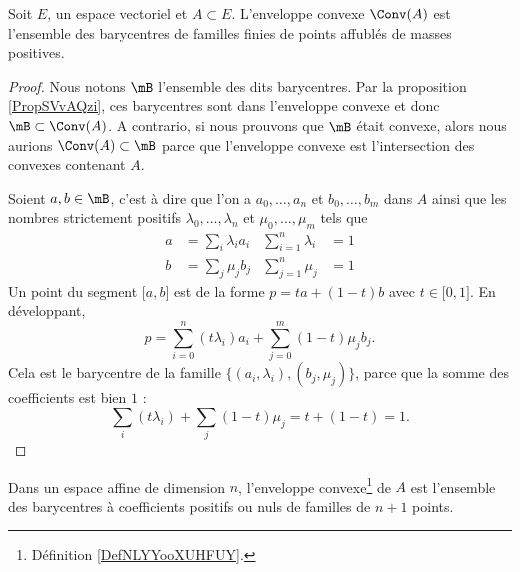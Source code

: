 \begin{proposition} \label{PropYHMTmZX}
    Soit \( E\), un espace vectoriel et \( A\subset E\). L'enveloppe convexe \( \Conv(A)\) est l'ensemble des barycentres de familles finies de points affublés de masses positives.
\end{proposition}

\begin{proof}
    Nous notons \( \mB\) l'ensemble des dits barycentres. Par la proposition \ref{PropSVvAQzi}, ces barycentres sont dans l'enveloppe convexe et donc \( \mB\subset\Conv(A)\). A contrario, si nous prouvons que \( \mB\) était convexe, alors nous aurions \( \Conv(A)\subset\mB\) parce que l'enveloppe convexe est l'intersection des convexes contenant $A$.

    Soient \( a,b\in\mB\), c'est à dire que l'on a \( a_0,\ldots, a_n\) et \( b_0,\ldots, b_m\) dans \( A\) ainsi que les nombres strictement positifs \( \lambda_0,\ldots, \lambda_n\) et \( \mu_0,\ldots, \mu_m\) tels que
    \begin{subequations}
        \begin{align}
            a&=\sum_i\lambda_ia_i       & \sum_{i=1}^n\lambda_i&=1\\
            b&=\sum_j\mu_jb_j           &\sum_{j=1}^n\mu_j&=1
        \end{align}
    \end{subequations}
    Un point du segment \( \mathopen[ a , b \mathclose]\) est de la forme \( p=ta+(1-t)b\) avec \( t\in \mathopen[ 0 , 1 \mathclose]\). En développant,
    \begin{equation}
        p=\sum_{i=0}^n(t\lambda_i)a_i+\sum_{j=0}^m(1-t)\mu_jb_j.
    \end{equation}
    Cela est le barycentre de la famille \( \{ (a_i,\lambda_i),(b_j,\mu_j) \}\), parce que la somme des coefficients est bien \( 1\) :
    \begin{equation}
        \sum_i(t\lambda_i)+\sum_j(1-t)\mu_j=t+(1-t)=1.
    \end{equation}
\end{proof}


\begin{theorem} \label{ThoJLDjXLe}
    Dans un espace affine de dimension \( n\), l'enveloppe convexe\footnote{Définition \ref{DefNLYYooXUHFUY}.} de \( A\) est l'ensemble des barycentres à coefficients positifs ou nuls de familles de \( n+1\) points.
\end{theorem}

